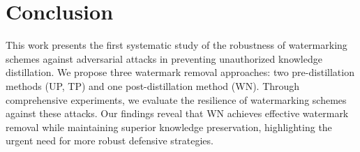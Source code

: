 \vspace{-3pt}
\section{Conclusion}
This work presents the first systematic study of the robustness of watermarking schemes against adversarial attacks in preventing unauthorized knowledge distillation. We propose three watermark removal approaches: two pre-distillation methods (UP, TP) and one post-distillation method (WN). Through comprehensive experiments, we evaluate the resilience of watermarking schemes against these attacks. Our findings reveal that WN achieves effective watermark removal while maintaining superior knowledge preservation, highlighting the urgent need for more robust defensive strategies.